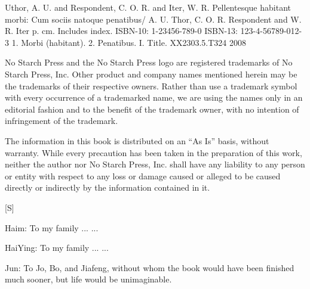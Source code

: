 \begin{copyrightpage}
\begin{cipblock}
Uthor, A. U. and Respondent, C. O. R. and Iter, W. R.
  Pellentesque habitant morbi: Cum sociis natoque penatibus/
  A. U. Thor, C. O. R. Respondent and W. R. Iter
       p. cm.
  Includes index.
  ISBN-10: 1-23456-789-0
  ISBN-13: 123-4-56789-012-3
  1.  Morbi (habitant).  2. Penatibus. I. Title.
XX2303.5.T324 2008
\end{cipblock}

No Starch Press and the No Starch Press logo are registered trademarks
of No Starch Press, Inc. Other product and company names mentioned
herein may be the trademarks of their respective owners. Rather than
use a trademark symbol with every occurrence of a trademarked name, we
are using the names only in an editorial fashion and to the benefit of
the trademark owner, with no intention of infringement of the
trademark.

The information in this book is distributed on an ``As Is'' basis,
without warranty. While every precaution has been taken in the
preparation of this work, neither the author nor No Starch Press, Inc.
shall have any liability to any person or entity with respect to any
loss or damage caused or alleged to be caused directly or indirectly
by the information contained in it.

\vspace{0.7in}

[S]

\end{copyrightpage}

\begin{dedicationpage}
  Haim: To my family ... ...
  

  \bigskip

  HaiYing: To my family ... ...

  \bigskip

  Jun: To Jo, Bo, and Jiafeng, without whom the book would have been finished
  much sooner, but life would be unimaginable.
  

\end{dedicationpage}


